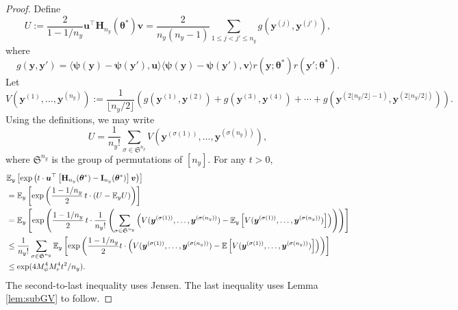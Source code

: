 \documentclass[11pt]{article}
\numberwithin{equation}{section}
\numberwithin{theorem}{section}
\def\Hb{\mathbf{H}}
\def\Ib{\mathbf{I}}
\def\fatu{\boldsymbol{u}}
\def\fatv{\boldsymbol{v}}
\def\faty{\boldsymbol{y}}
\def\fattheta{\boldsymbol{\theta}}
\def\fatpsi{\boldsymbol{\psi}}
\theoremstyle{definition}
\theoremstyle{remark}
\begin{document}
\begin{proof}
Define
\begin{equation}
U
:= \frac{2}{1-1/n_y} \fatu^\top \Hb_{n_y}(\fattheta^*) \fatv
= \frac{2}{n_y(n_y-1)} \sum_{1 \leq j < j' \leq n_y} g(\faty^{(j)},\faty^{(j')}),
\end{equation}
where
\begin{equation}
g(\faty,\faty')
= \langle \fatpsi(\faty) - \fatpsi(\faty'),\fatu \rangle \langle\fatpsi(\faty) - \fatpsi(\faty'),\fatv\rangle r(\faty;\fattheta^*) r(\faty';\fattheta^*).
\end{equation}
Let
\begin{equation}
V(\faty^{(1)},\dots,\faty^{(n_y)})
:= \frac{1}{\lfloor n_y/2\rfloor} \left( g(\faty^{(1)},\faty^{(2)}) + g(\faty^{(3)},\faty^{(4)}) + \cdots + g(\faty^{(2\lfloor n_y/2\rfloor-1)},\faty^{(2\lfloor n_y/2\rfloor)}) \right).
\end{equation}
Using the definitions, we may write
\begin{equation}
U
= \frac{1}{n_y!} \sum_{\sigma \in \mathfrak{S}^{n_y}} V(\faty^{(\sigma(1))},\dots,\faty^{(\sigma(n_y))}),
\end{equation}
where $\mathfrak{S}^{n_y}$ is the group of permutations of $[n_y]$.
For any $t>0$,
\begin{equation}
\begin{aligned}
& \EE_y \left[ \exp\left( t\cdot \fatu^\top \left[ \Hb_{n_y}(\fattheta^*) - \Ib_{n_y}(\fattheta^*) \right] \fatv \right) \right] \\
&= \EE_y \left[ \exp\left( \frac{1-1/n_y}{2} \, t \cdot \left( U - \EE_y U \right) \right) \right] \\
&= \EE_y \left[ \exp\left( \frac{1-1/n_y}{2} \, t \cdot \frac{1}{n_y!} \left( \sum_{\sigma \in \mathfrak{S}^{n_y}} \left( V(\faty^{(\sigma(1))},\dots,\faty^{(\sigma(n_y))}) - \EE_y \left[ V(\faty^{(\sigma(1))},\dots,\faty^{(\sigma(n_y))}) \right] \right) \right) \right) \right] \\
&\leq \frac{1}{n_y!} \sum_{\sigma \in \mathfrak{S}^{n_y}} \EE_y \left[ \exp\left( \frac{1-1/n_y}{2} t \cdot \left( V(\faty^{(\sigma(1))},\dots,\faty^{(\sigma(n_y))}) - \EE\left[ V(\faty^{(\sigma(1))},\dots,\faty^{(\sigma(n_y))}) \right] \right) \right) \right] \\
&\leq \exp(4 M_\psi^4 M_r^4 t^2 / n_y).
\end{aligned}
\end{equation}
The second-to-last inequality uses Jensen.
The last inequality uses Lemma \ref{lem:subGV} to follow.
\end{proof}
\end{document}
